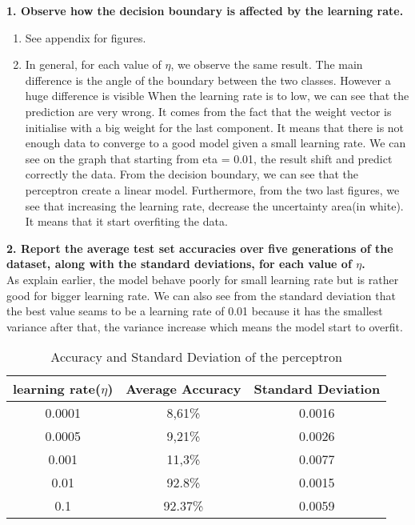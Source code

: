 \documentclass[acmconf,nonacm=true]{acmart}
\begin{document}
\textbf{1. Observe how the decision boundary is affected by the learning rate.}
    \begin{enumerate}
    \item See appendix for figures.
    \item In general, for each value of $\eta$, we observe the same result. The main difference is the angle of the boundary between the two classes. However a huge difference is visible When the learning rate is to low, we can see that the prediction are very wrong. It comes from the fact that the weight vector is initialise with a big weight for the last component. It means that there is not enough data to converge to a good model given a small learning rate. We can see on the graph that starting from eta = 0.01, the result shift and predict correctly the data. From the decision boundary, we can see that the perceptron create a linear model. Furthermore, from the two last figures, we see that increasing the learning rate, decrease the uncertainty area(in white). It means that it start overfiting the data.
    \end{enumerate}

\textbf{2. Report the average test set accuracies over five generations of the dataset,
along with the standard deviations, for each value of $\eta$.}\\

As explain earlier, the model behave poorly for small learning rate but is rather good for bigger learning rate. 
We can also see from the standard deviation that the best value seams to be a learning rate of 0.01 because it has the smallest variance after that, the variance increase which means the model start to overfit.

\begin{table}[H]
    \centering
    \caption{Accuracy and Standard Deviation of the perceptron}
    \begin{tabular}{|c|c|c|}
    \hline
     learning rate($\eta$) & Average Accuracy & Standard Deviation \\
    \hline
    0.0001 & 8,61\% & 0.0016 \\
    0.0005 & 9,21\% & 0.0026 \\
    0.001 & 11,3\% & 0.0077 \\
    0.01 & 92.8\% & 0.0015 \\
    0.1 & 92.37\% & 0.0059 \\
    \hline
    \end{tabular}
    \end{table}
\end{document}

